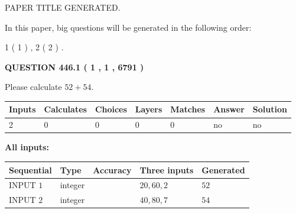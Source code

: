 \documentclass[12pt]{article}
\begin{document}
   
\vspace{0.2in}
   
   
   
   
   
   
   
   
 \vspace{0.2in}
 
 
 
 
   
   
 PAPER TITLE GENERATED.
   
   
   
\vspace{0.2in}
   
In this paper, big questions will be generated in the following order: 
   
   
   1 ( 1 )
 ,
   2 ( 2 )
 .
  
\vspace{0.2in}
  
{\textbf{\Large{QUESTION
446.1 
 ( 1 , 1 , 6791 )
}}}
  
  
 
Please calculate $ %
52 +  %
54 $.
 
 
   
   
   
   
\noindent\begin{tabular}{|l|l|l|l|l|l|l|}
 \hline
Inputs & Calculates & Choices & Layers & Matches & Answer & Solution \\ \hline
 2  & 
 0  & 
 0
  & 
 0  & 
 0  & 
  no & 
  no 
  \\ \hline
 \end{tabular}
   
   
   
   
\noindent{}
   
   
   
   
\noindent\vspace{0.1in}\hspace{-0.08in} {\textbf{\Large{All inputs: }}}
   
   
  
  
\noindent\begin{tabular}{|l|l|l|l|l|}
\hline
 Sequential & Type & Accuracy & Three inputs & Generated \\ 
\hline
 
 
  INPUT $  1 $ & integer &  & $
 20
 , 
 60
 , 
 2
 $ & $ 52 $ 
 \\  \hline  
 
 
  INPUT $  2 $ & integer &  & $
 40
 , 
 80
 , 
 7
 $ & $ 54 $ 
 \\  \hline  
 \end{tabular}
   
\end{document}
